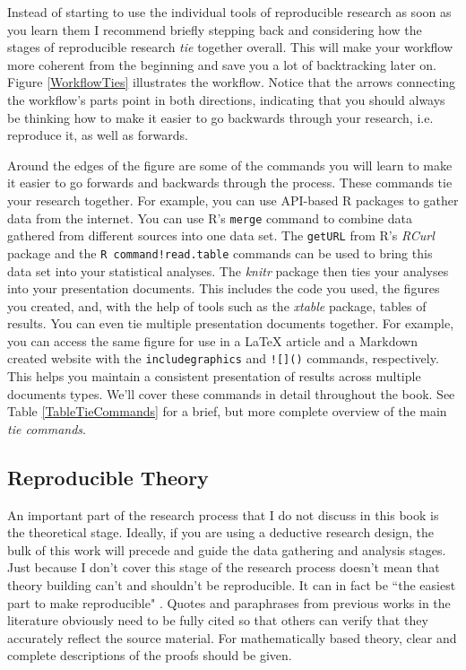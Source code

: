 \documentclass[krantz1]{krantz}
\begin{document}
Instead of starting to use the individual tools of reproducible research  as soon as you learn them I recommend briefly stepping back and considering how the stages of reproducible research {\emph{tie}} together overall. This will make your workflow more coherent from the beginning and save you a lot of backtracking later on.  Figure \ref{WorkflowTies} illustrates the workflow. Notice that the arrows connecting the workflow's parts point in both directions, indicating that you should always be thinking how to make it easier to go backwards through your research, i.e. reproduce it, as well as forwards. 

Around the edges of the figure are some of the commands you will learn to make it easier to go forwards and backwards through the process. These commands tie your research together. For example, you can use API-based R packages to gather data from the internet. You can use R's \texttt{merge} command to combine data gathered from different sources into one data set. The \texttt{getURL} from R's \emph{RCurl} package \citep{R-Rcurl} and the {\texttt{R command!read.table}} commands can be used to bring this data set into your statistical analyses. The {\emph{knitr}} package then ties your analyses into your presentation documents. This includes the code you used, the figures you created, and, with the help of tools such as the {\emph{xtable}} package, tables of results. You can even tie multiple presentation documents together. For example, you can access the same figure for use in a LaTeX article and a Markdown created website with the \texttt{includegraphics} and \texttt{![]()}\index{![]()} commands, respectively. This helps you maintain a consistent presentation of results across multiple documents types. We'll cover these commands in detail throughout the book. See Table \ref{TableTieCommands} for a brief, but more complete overview of the main {\emph{tie commands}}. 

\subsection{Reproducible Theory}

An important part of the research process that I do not discuss in this book is the theoretical stage. Ideally, if you are using a deductive research design, the bulk of this work will precede and guide the data gathering and analysis stages. Just because I don't cover this stage of the research process doesn't mean that theory building can't and shouldn't be reproducible. It can in fact be ``the easiest part to make reproducible" \cite[1254]{Vandewalle2007}. Quotes and paraphrases from previous works in the literature obviously need to be fully cited so that others can verify that they accurately reflect the source material. For mathematically based theory, clear and complete descriptions of the proofs should be given. 
\end{document}

